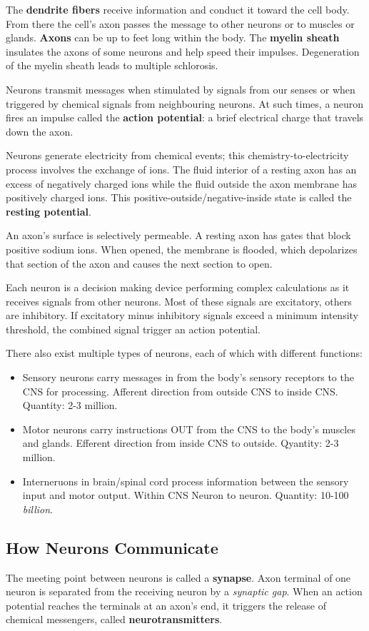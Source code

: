 \documentclass[12pt]{article}
\begin{document}
The \textbf{dendrite fibers} receive information and conduct it toward the cell body. From there the cell's axon passes the message to other neurons or to muscles or glands. \textbf{Axons} can be up to feet long within the body. The \textbf{myelin sheath} insulates the axons of some neurons and help speed their impulses. Degeneration of the myelin sheath leads to multiple schlorosis.

Neurons transmit messages when stimulated by signals from our senses or when triggered by chemical signals from neighbouring neurons. At such times, a neuron fires an impulse called the \textbf{action potential}: a brief electrical charge that travels down the axon.

Neurons generate electricity from chemical events; this chemistry-to-electricity process involves the exchange of ions. The fluid interior of a resting axon has an excess of negatively charged ions while the fluid outside the axon membrane has positively charged ions. This positive-outside/negative-inside state is called the \textbf{resting potential}.

An axon's surface is selectively permeable. A resting axon has gates that block positive sodium ions. When opened, the membrane is flooded, which depolarizes that section of the axon and causes the next section to open.

Each neuron is a decision making device performing complex calculations as it receives signals from other neurons. Most of these signals are excitatory, others are inhibitory. If excitatory minus inhibitory signals exceed a minimum intensity threshold, the combined signal trigger an action potential.

There also exist multiple types of neurons, each of which with different functions:
\begin{itemize}
\item Sensory neurons carry messages in from the body's sensory receptors to the CNS for processing. Afferent direction from outside CNS to inside CNS. Quantity: 2-3 million.
\item Motor neurons carry instructions OUT from the CNS to the body's muscles and glands. Efferent direction from inside CNS to outside. Qyantity: 2-3 million.
\item Interneruons in brain/spinal cord process information between the sensory input and motor output. Within CNS Neuron to neuron. Quantity: 10-100 {\it billion}.
\end{itemize}

\subsection*{How Neurons Communicate}
The meeting point between neurons is called a \textbf{synapse}. Axon terminal of one neuron is separated from the receiving neuron by a \textit{synaptic gap}. When an action potential reaches the terminals at an axon's end, it triggers the release of chemical messengers, called \textbf{neurotransmitters}.
\end{document}

